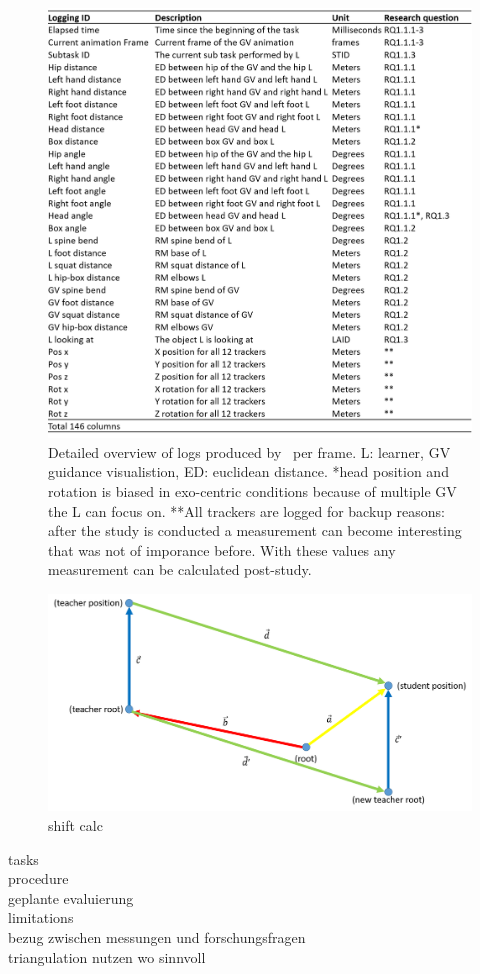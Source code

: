 \begin{figure}[htb]
	\centering
	\includegraphics[width=\textwidth]{figures/logging_detail.png}
	\caption[logging detail]{Detailed overview of logs produced by \exgo\ per frame. L: learner, GV guidance visualistion, ED: euclidean distance. *head position and rotation is biased in exo-centric conditions because of multiple GV the L can focus on. **All trackers are logged for backup reasons: after the study is conducted a measurement can become interesting that was not of imporance before. With these values any measurement can be calculated post-study.}
	\label{fig:logging_detail}
\end{figure}





\begin{figure}[htb]
	\centering
	\includegraphics[width=\textwidth]{figures/shift_calc.png}
	\caption[shift calc]{shift calc}
	\label{fig:shift_calc}
\end{figure}





tasks\\
procedure\\
geplante evaluierung\\
limitations\\
bezug zwischen messungen und forschungsfragen\\
triangulation nutzen wo sinnvoll\\
